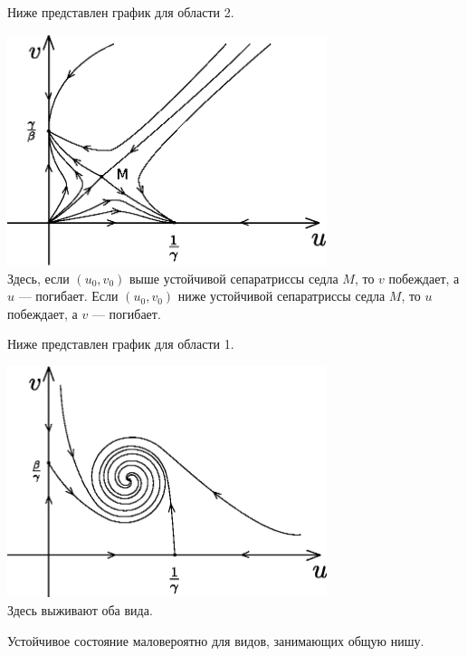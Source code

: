 Ниже представлен график для области 2.
\begin{center}
\includegraphics[width = 0.7\textwidth]{ch6/system(2).eps}\\
Здесь, если $(u_0, v_0)$ выше устойчивой сепаратриссы седла $M$, то $v$ побеждает, а $u$ --- погибает.
Если $(u_0, v_0)$ ниже устойчивой сепаратриссы седла $M$, то $u$ побеждает, а $v$ --- погибает.
\end{center}
Ниже представлен график для области 1.
\begin{center}
\includegraphics[width = 0.7\textwidth]{ch6/system(1).eps}\\
Здесь выживают оба вида.
\end{center}
Устойчивое состояние маловероятно для видов, занимающих общую нишу.
